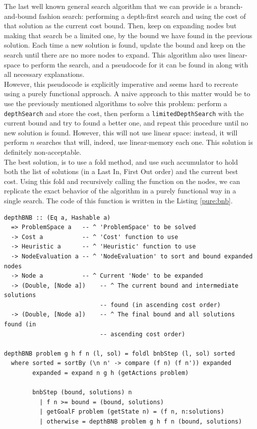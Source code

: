 The last well known general search algorithm that we can provide is a
branch-and-bound fashion search: performing a depth-first search and using the
cost of that solution as the current cost bound. Then, keep on expanding nodes
but making that search be a limited one, by the bound we have found in the
previous solution. Each time a new solution is found, update the bound and keep
on the search until there are no more nodes to expand. This algorithm also uses
linear-space to perform the search, and a pseudocode for it can be found in
\cite{zhang-1995-bnb} along with all necessary explanations.\\

However, this pseudocode is explicitly imperative and seems hard to recreate
using a purely functional approach. A naive approach to this matter would be to
use the previously mentioned algorithms to solve this problem: perform a
\texttt{depthSearch} and store the cost, then perform a
\texttt{limitedDepthSearch} with the current bound and try to found a better
one, and repeat this procedure until no new solution is found. However, this
will not use linear space: instead, it will perform $n$ searches that will,
indeed, use linear-memory each one. This solution is definitely
non-acceptable.\\

The best solution, is to use a fold method, and use such accumulator to hold
both the list of solutions (in a Last In, First Out order) and the current best
cost. Using this fold and recursively calling the function on the nodes, we can
replicate the exact behavior of the algorithm in a purely functional way in a
single search. The code of this function is written in the Listing
\ref{pure:bnb}.\\

\begin{lstlisting}[style=haskell,
caption=Pure \texttt{depthBNB} implementation, label=pure:bnb]
depthBNB :: (Eq a, Hashable a)
  => ProblemSpace a   -- ^ 'ProblemSpace' to be solved
  -> Cost a           -- ^ 'Cost' function to use
  -> Heuristic a      -- ^ 'Heuristic' function to use
  -> NodeEvaluation a -- ^ 'NodeEvaluation' to sort and bound expanded nodes
  -> Node a           -- ^ Current 'Node' to be expanded
  -> (Double, [Node a])    -- ^ The current bound and intermediate solutions
                           -- found (in ascending cost order)
  -> (Double, [Node a])    -- ^ The final bound and all solutions found (in
                           -- ascending cost order)

depthBNB problem g h f n (l, sol) = foldl bnbStep (l, sol) sorted
  where sorted = sortBy (\n n' -> compare (f n) (f n')) expanded
        expanded = expand n g h (getActions problem)

        bnbStep (bound, solutions) n
          | f n >= bound = (bound, solutions)
          | getGoalF problem (getState n) = (f n, n:solutions)
          | otherwise = depthBNB problem g h f n (bound, solutions)
\end{lstlisting}


